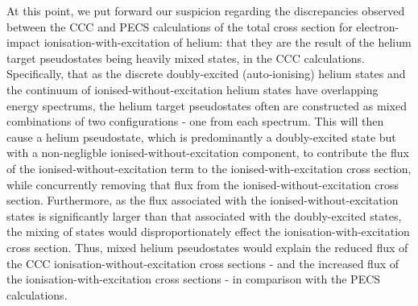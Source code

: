 \documentclass[]{article}
\begin{document}
At this point, we put forward our suspicion regarding the discrepancies observed
between the CCC and PECS calculations of the total cross section for
electron-impact ionisation-with-excitation of helium: that they are the result
of the helium target pseudostates being heavily mixed states, in the CCC
calculations.
Specifically, that as the discrete doubly-excited (auto-ionising) helium states
and the continuum of ionised-without-excitation helium states have overlapping
energy spectrums, the helium target pseudostates often are constructed as mixed
combinations of two configurations - one from each spectrum.
This will then cause a helium pseudostate, which is predominantly a
doubly-excited state but with a non-negligble ionised-without-excitation
component, to contribute the flux of the ionised-without-excitation term to the
ionised-with-excitation cross section, while concurrently removing that flux
from the ionised-without-excitation cross section.
Furthermore, as the flux associated with the ionised-without-excitation states
is significantly larger than that associated with the doubly-excited states, the
mixing of states would disproportionately effect the ionisation-with-excitation
cross section.
Thus, mixed helium pseudostates would explain the reduced flux of the CCC
ionisation-without-excitation cross sections - and the increased flux of the
ionisation-with-excitation cross sections - in comparison with the PECS
calculations.
\end{document}

